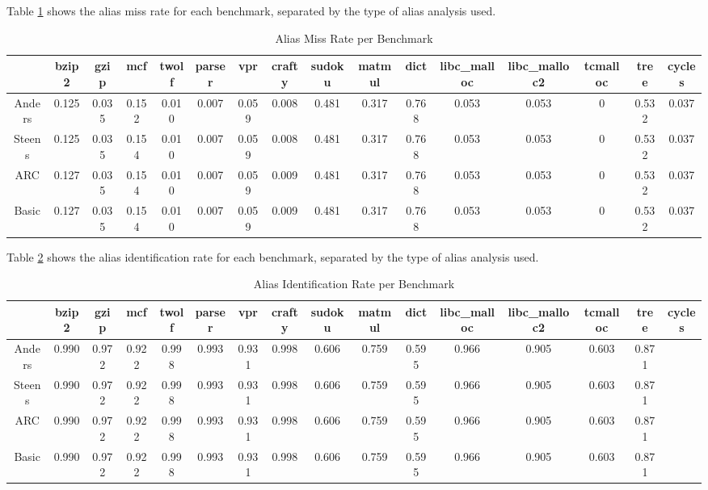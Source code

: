 Table \ref{table:3} shows the alias miss rate for each benchmark, separated by the type of alias analysis used.

\begin{table} [h!]
\centering
   \begin{tabular} {|c|c c c c c c c c c c c c c c c|}
      \hline
      & bzip2 & gzip & mcf & twolf & parser & vpr & crafty & sudoku & matmul & dict & libc\_malloc & libc\_malloc2 & tcmalloc & tree & cycles \\
      \hline
      Anders & 0.125 & 0.035 & 0.152 & 0.010 & 0.007 & 0.059 & 0.008 & 0.481 & 0.317 & 0.768 & 0.053 & 0.053 & 0 & 0.532 & 0.037 \\
      \hline
      Steens & 0.125 & 0.035 & 0.154 & 0.010 & 0.007 & 0.059 & 0.008 & 0.481 & 0.317 & 0.768 & 0.053 & 0.053 & 0 & 0.532 & 0.037 \\
      \hline
      ARC & 0.127 & 0.035 & 0.154 & 0.010 & 0.007 & 0.059 & 0.009 & 0.481 & 0.317 & 0.768 & 0.053 & 0.053 & 0 & 0.532 & 0.037 \\
      \hline
      Basic & 0.127 & 0.035 & 0.154 & 0.010 & 0.007 & 0.059 & 0.009 & 0.481 & 0.317 & 0.768 & 0.053 & 0.053 & 0 & 0.532 & 0.037 \\
      \hline
   \end{tabular}
   \caption{Alias Miss Rate per Benchmark}
   \label{table:3}
\end{table}

Table \ref{table:4} shows the alias identification rate for each benchmark, separated by the type of alias analysis used.

\begin{table} [h!]
\centering
   \begin{tabular} {|c|c c c c c c c c c c c c c c c|}
      \hline
      & bzip2 & gzip & mcf & twolf & parser & vpr & crafty & sudoku & matmul & dict & libc\_malloc & libc\_malloc2 & tcmalloc & tree & cycles \\
      \hline
      Anders & 0.990 & 0.972 & 0.922 & 0.998 & 0.993 & 0.931 & 0.998 & 0.606 & 0.759 & 0.595 & 0.966 & 0.905 & 0.603 & 0.871 \\
      \hline
      Steens & 0.990 & 0.972 & 0.922 & 0.998 & 0.993 & 0.931 & 0.998 & 0.606 & 0.759 & 0.595 & 0.966 & 0.905 & 0.603 & 0.871 \\
      \hline
      ARC & 0.990 & 0.972 & 0.922 & 0.998 & 0.993 & 0.931 & 0.998 & 0.606 & 0.759 & 0.595 & 0.966 & 0.905 & 0.603 & 0.871 \\
      \hline
      Basic & 0.990 & 0.972 & 0.922 & 0.998 & 0.993 & 0.931 & 0.998 & 0.606 & 0.759 & 0.595 & 0.966 & 0.905 & 0.603 & 0.871 \\
      \hline
   \end{tabular}
   \caption{Alias Identification Rate per Benchmark}
   \label{table:4}
\end{table}

